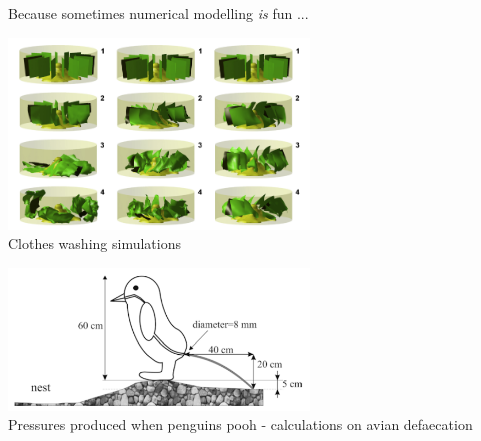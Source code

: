 Because sometimes numerical modelling {\sl is} fun ...

\begin{center}
\includegraphics[width=8cm]{images/interesting/akds14}\\
{\small Clothes washing simulations \cite{akds14}}
\end{center}

\begin{center}
\includegraphics[width=8cm]{images/interesting/mega03}\\
{\small Pressures produced when penguins pooh - calculations on avian defaecation \cite{mega03}}
\end{center}

\begin{center}
\cite{grle81}
\end{center}

\begin{center}
\cite{pefc89}
\end{center}
